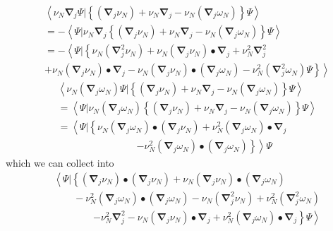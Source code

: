 \documentclass[aps,preprint]{revtex4}%
\begin{document}
\begin{align}
& \left\langle \nu_{N}\mathbf{\nabla}_{j}\Psi|\left\{  \left(  \mathbf{\nabla
}_{j}\nu_{N}\right)  +\nu_{N}\mathbf{\nabla}_{j}-\nu_{N}\left(  \mathbf{\nabla
}_{j}\omega_{N}\right)  \right\}  \Psi\right\rangle \nonumber\\
& =-\left\langle \Psi|\nu_{N}\mathbf{\nabla}_{j}\left\{  \left(
\mathbf{\nabla}_{j}\nu_{N}\right)  +\nu_{N}\mathbf{\nabla}_{j}-\nu_{N}\left(
\mathbf{\nabla}_{j}\omega_{N}\right)  \right\}  \Psi\right\rangle \nonumber\\
& =-\left\langle \Psi|\left\{  \nu_{N}\left(  \mathbf{\nabla}_{j}^{2}\nu
_{N}\right)  +\nu_{N}\left(  \mathbf{\nabla}_{j}\nu_{N}\right)  \bullet
\mathbf{\nabla}_{j}+\nu_{N}^{2}\mathbf{\nabla}_{j}^{2}\right.  \right.
\nonumber\\
& \left.  \left.  +\nu_{N}\left(  \mathbf{\nabla}_{j}\nu_{N}\right)
\bullet\mathbf{\nabla}_{j}-\nu_{N}\left(  \mathbf{\nabla}_{j}\nu_{N}\right)
\bullet\left(  \mathbf{\nabla}_{j}\omega_{N}\right)  -\nu_{N}^{2}\left(
\mathbf{\nabla}_{j}^{2}\omega_{N}\right)  \Psi\right\}  \right\rangle
\end{align}%
\begin{align}
& \left\langle \nu_{N}\left(  \mathbf{\nabla}_{j}\omega_{N}\right)
\Psi|\left\{  \left(  \mathbf{\nabla}_{j}\nu_{N}\right)  +\nu_{N}%
\mathbf{\nabla}_{j}-\nu_{N}\left(  \mathbf{\nabla}_{j}\omega_{N}\right)
\right\}  \Psi\right\rangle \nonumber\\
& =\left\langle \Psi|\nu_{N}\left(  \mathbf{\nabla}_{j}\omega_{N}\right)
\left\{  \left(  \mathbf{\nabla}_{j}\nu_{N}\right)  +\nu_{N}\mathbf{\nabla
}_{j}-\nu_{N}\left(  \mathbf{\nabla}_{j}\omega_{N}\right)  \right\}
\Psi\right\rangle \nonumber\\
& =\left\langle \Psi|\left\{  \nu_{N}\left(  \mathbf{\nabla}_{j}\omega
_{N}\right)  \bullet\left(  \mathbf{\nabla}_{j}\nu_{N}\right)  +\nu_{N}%
^{2}\left(  \mathbf{\nabla}_{j}\omega_{N}\right)  \bullet\mathbf{\nabla}%
_{j}\right.  \right.  \nonumber\\
& \qquad\qquad\qquad\qquad\left.  \left.  -\nu_{N}^{2}\left(  \mathbf{\nabla
}_{j}\omega_{N}\right)  \bullet\left(  \mathbf{\nabla}_{j}\omega_{N}\right)
\right\}  \right\rangle \Psi
\end{align}
which we can collect into
\begin{align}
& \left\langle \Psi|\left\{  \left(  \mathbf{\nabla}_{j}\nu_{N}\right)
\bullet\left(  \mathbf{\nabla}_{j}\nu_{N}\right)  +\nu_{N}\left(
\mathbf{\nabla}_{j}\nu_{N}\right)  \bullet\left(  \mathbf{\nabla}_{j}%
\omega_{N}\right)  \right.  \right.  \nonumber\\
& \qquad-\nu_{N}^{2}\left(  \mathbf{\nabla}_{j}\omega_{N}\right)
\bullet\left(  \mathbf{\nabla}_{j}\omega_{N}\right)  -\nu_{N}\left(
\mathbf{\nabla}_{j}^{2}\nu_{N}\right)  +\nu_{N}^{2}\left(  \mathbf{\nabla}%
_{j}^{2}\omega_{N}\right)  \nonumber\\
& \qquad\qquad\left.  \left.  -\nu_{N}^{2}\mathbf{\nabla}_{j}^{2}-\nu
_{N}\left(  \mathbf{\nabla}_{j}\nu_{N}\right)  \bullet\mathbf{\nabla}_{j}%
+\nu_{N}^{2}\left(  \mathbf{\nabla}_{j}\omega_{N}\right)  \bullet
\mathbf{\nabla}_{j}\right\}  \Psi\right\rangle
\end{align}
\end{document}

